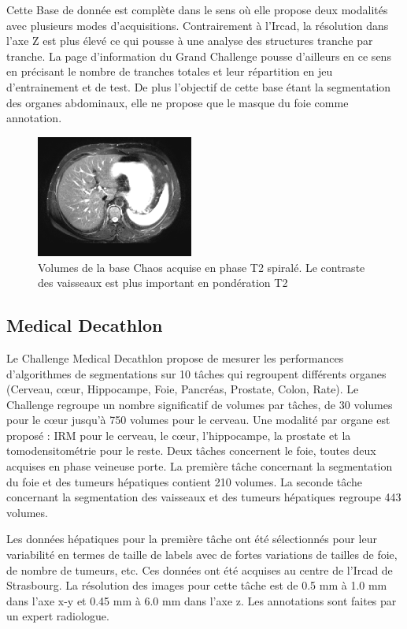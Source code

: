 Cette Base de donnée est complète dans le sens où elle propose deux modalités avec plusieurs modes d'acquisitions. Contrairement à l'Ircad, la résolution dans l'axe Z est plus élevé ce qui pousse à une analyse des structures tranche par tranche. La page d'information du Grand Challenge pousse d'ailleurs en ce sens en précisant le nombre de tranches totales et leur répartition en jeu d'entrainement et de test. De plus l'objectif de cette base étant la segmentation des organes abdominaux, elle ne propose que le masque du foie comme annotation.

\begin{figure}
    \centering
    \includegraphics[height=4cm]{Images/T2_SPIR.png}
    \caption{Volumes de la base Chaos acquise en phase T2 spiralé. Le contraste des vaisseaux est plus important en pondération T2}
    \label{fig:T2 MRI}
\end{figure}

\subsection{Medical Decathlon}

Le Challenge Medical Decathlon propose de mesurer les performances d'algorithmes de segmentations sur 10 tâches qui regroupent différents organes (Cerveau, cœur, Hippocampe, Foie, Pancréas, Prostate, Colon, Rate). Le Challenge regroupe un nombre significatif de volumes par tâches, de 30 volumes pour le cœur jusqu'à 750 volumes pour le cerveau. Une modalité par organe est proposé : IRM pour le cerveau, le cœur, l'hippocampe, la prostate et la tomodensitométrie pour le reste. Deux tâches concernent le foie, toutes deux acquises en phase veineuse porte. La première tâche concernant la segmentation du foie et des tumeurs hépatiques contient 210 volumes. La seconde tâche concernant la segmentation des vaisseaux et des tumeurs hépatiques regroupe 443 volumes.

Les données hépatiques pour la première tâche ont été sélectionnés pour leur variabilité en termes de taille de labels avec de fortes variations de tailles de foie, de nombre de tumeurs, etc. Ces données ont été acquises au centre de l'Ircad de Strasbourg. La résolution des images pour cette tâche est de 0.5 mm à 1.0 mm dans l'axe x-y et 0.45 mm à 6.0 mm dans l'axe z. Les annotations sont faites par un expert radiologue.

